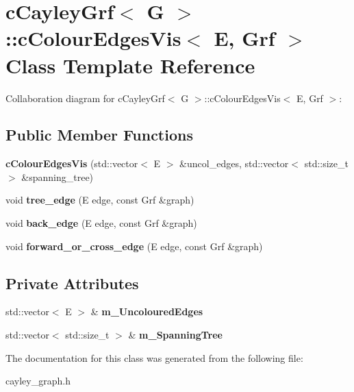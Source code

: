 \hypertarget{classcCayleyGrf_1_1cColourEdgesVis}{\section{c\-Cayley\-Grf$<$ G $>$\-:\-:c\-Colour\-Edges\-Vis$<$ E, Grf $>$ Class Template Reference}
\label{classcCayleyGrf_1_1cColourEdgesVis}
}


Collaboration diagram for c\-Cayley\-Grf$<$ G $>$\-:\-:c\-Colour\-Edges\-Vis$<$ E, Grf $>$\-:
\subsection*{Public Member Functions}
\begin{DoxyCompactItemize}
\item 
\hypertarget{classcCayleyGrf_1_1cColourEdgesVis_a3a0757b2a0d975cdcd9f933eb6b11077}{{\bfseries c\-Colour\-Edges\-Vis} (std\-::vector$<$ E $>$ \&uncol\-\_\-edges, std\-::vector$<$ std\-::size\-\_\-t $>$ \&spanning\-\_\-tree)}\label{classcCayleyGrf_1_1cColourEdgesVis_a3a0757b2a0d975cdcd9f933eb6b11077}

\item 
\hypertarget{classcCayleyGrf_1_1cColourEdgesVis_a6943930a8499e2dc40c1ff8d389e6aa2}{void {\bfseries tree\-\_\-edge} (E edge, const Grf \&graph)}\label{classcCayleyGrf_1_1cColourEdgesVis_a6943930a8499e2dc40c1ff8d389e6aa2}

\item 
\hypertarget{classcCayleyGrf_1_1cColourEdgesVis_ae6eaab06b54e93abf2d32afa26202f54}{void {\bfseries back\-\_\-edge} (E edge, const Grf \&graph)}\label{classcCayleyGrf_1_1cColourEdgesVis_ae6eaab06b54e93abf2d32afa26202f54}

\item 
\hypertarget{classcCayleyGrf_1_1cColourEdgesVis_a3a5f071258d3482f9a1485c2b93690f1}{void {\bfseries forward\-\_\-or\-\_\-cross\-\_\-edge} (E edge, const Grf \&graph)}\label{classcCayleyGrf_1_1cColourEdgesVis_a3a5f071258d3482f9a1485c2b93690f1}

\end{DoxyCompactItemize}
\subsection*{Private Attributes}
\begin{DoxyCompactItemize}
\item 
\hypertarget{classcCayleyGrf_1_1cColourEdgesVis_a7735ee430b94a00ab35184dd72abdcd1}{std\-::vector$<$ E $>$ \& {\bfseries m\-\_\-\-Uncoloured\-Edges}}\label{classcCayleyGrf_1_1cColourEdgesVis_a7735ee430b94a00ab35184dd72abdcd1}

\item 
\hypertarget{classcCayleyGrf_1_1cColourEdgesVis_ae82002348dbe1cac03fadf4f2e6d8341}{std\-::vector$<$ std\-::size\-\_\-t $>$ \& {\bfseries m\-\_\-\-Spanning\-Tree}}\label{classcCayleyGrf_1_1cColourEdgesVis_ae82002348dbe1cac03fadf4f2e6d8341}

\end{DoxyCompactItemize}


The documentation for this class was generated from the following file\-:\begin{DoxyCompactItemize}
\item 
cayley\-\_\-graph.\-h\end{DoxyCompactItemize}
